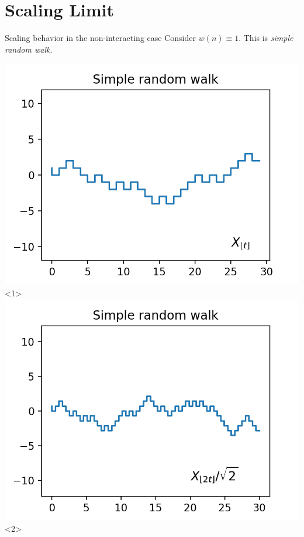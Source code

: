 \documentclass{if-beamer}
\begin{document}
\section{Scaling Limit}
\begin{frame}{Scaling behavior in the non-interacting case}
    Consider $w(n) \equiv 1$. This is \textit{simple random walk}.
    
        \begin{minipage}{0.45\textwidth}
            \centering
            \includegraphics[width=\textwidth]{figures/srw_x1.png}<1>
            \includegraphics[width=\textwidth]{figures/srw_x2.png}<2>

\end{minipage}
\end{frame}
\end{document}
